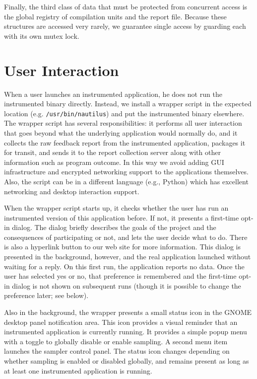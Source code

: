 \documentclass[10pt,twocolumn]{article}
\begin{document}
Finally, the third class of data that must be protected from concurrent access
is the global registry of compilation units and the report file.
Because these structures are accessed very rarely, we guarantee single 
access by guarding each with its own mutex lock.


\section{User Interaction}

When a user launches an instrumented application, he does not run the
instrumented binary directly.  Instead, we install a wrapper script in
the expected location (e.g. \texttt{/usr/bin/nautilus}) and put the
instrumented binary elsewhere.  The wrapper script has several
responsibilities:  it performs all user interaction
that goes beyond what the underlying application would normally do, and
it collects the raw feedback report from the instrumented
application, packages it for transit, and sends it to the report
collection server along with other information such as program
outcome.  In this way we avoid adding GUI infrastructure and
encrypted networking support to the applications themselves.
Also, the script can be in a different language (e.g., Python)
which has excellent networking and desktop interaction support.

When the wrapper script starts up, it checks whether the user has run
an instrumented version of this application before.  If not, it
presents a first-time opt-in dialog.  The dialog briefly describes the
goals of the project and the consequences of participating or not, and
lets the user decide what to do.  There is also a hyperlink button to
our web site for more information.  This dialog is presented in the
background, however, and the real application launched without waiting
for a reply.  On this first run, the application 
reports no data.  
Once the user has selected yes or no, that preference is
remembered and the first-time opt-in dialog is not shown on subsequent
runs (though it is possible to change the preference later; see below).

Also in the background, the wrapper presents a small status icon in
the GNOME desktop panel notification area.  This icon provides a
visual reminder that an instrumented application is currently running.
It provides a simple popup menu with a toggle to globally disable or
enable sampling.  A second menu item launches the sampler control
panel.  The status icon changes depending on whether sampling is
enabled or disabled globally, and remains present as long as at least
one instrumented application is running.  
\end{document}
